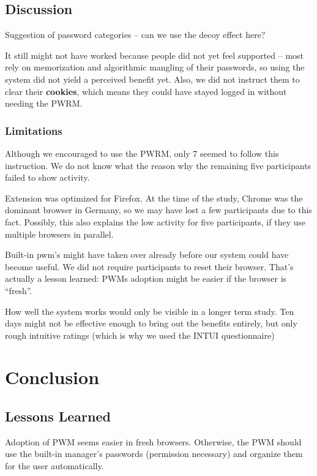 \subsection{Discussion}
Suggestion of password categories -- can we use the decoy effect here?

It still might not have worked because people did not yet feel supported -- most rely on memorization and algorithmic mangling of their passwords, so using the system did not yield a perceived benefit yet. Also, we did not instruct them to clear their \textbf{cookies}, which means they could have stayed logged in without needing the PWRM. 

\subsubsection{Limitations}

Although we encouraged to use the PWRM, only 7 seemed to follow this instruction. We do not know what the reason why the remaining five participants failed to show activity.

Extension was optimized for Firefox. At the time of the study, Chrome was the dominant browser in Germany, so we may have lost a few participants due to this fact. Possibly, this also explains the low activity for five participants, if they use multiple browsers in parallel. 

Built-in pwm's might have taken over already before our system could have become useful. We did not require participants to reset their browser. That's actually a lesson learned: PWMs adoption might be easier if the browser is ``fresh''.

How well the system works would only be visible in a longer term study. Ten days might not be effective enough to bring out the benefits entirely, but only rough intuitive ratings (which is why we used the INTUI questionnaire)


\section{Conclusion}

\subsection{Lessons Learned}
Adoption of PWM seems easier in fresh browsers. Otherwise, the PWM should use the built-in manager's passwords (permission necessary) and organize them for the user automatically. 

